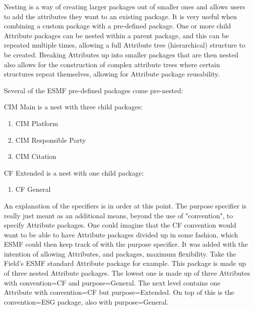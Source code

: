 %


\label{sec:AttPackNesting}


Nesting is a way of creating larger packages out of smaller ones and allows users to add the attributes they want to an existing package. It is very useful when combining a custom package with a pre-defined package. One or more child Attribute packages can be nested within a parent package, and this can be repeated multiple times, allowing a full Attribute tree (hierarchical) structure to be created.  Breaking Attributes up into smaller packages that are then nested also allows for the construction of complex attribute trees where certain structures repeat themselves, allowing for Attribute package reusability.


Several of the ESMF pre-defined packages come pre-nested:

CIM Main is a nest with three child packages:
\begin{enumerate}
   \item CIM Platform
   \item CIM Responsible Party
   \item CIM Citation
\end{enumerate}

CF Extended is a nest with one child package:

\begin{enumerate}
   \item CF General
\end{enumerate}

An explanation of the specifiers is in order at this point.  The purpose 
specifier is really just meant as an additional means, beyond the use of 
"convention", to specify Attribute packages.  One could imagine that the 
CF convention would want to be able to have Attribute packages divided 
up in some fashion, which ESMF could then keep track of with the purpose 
specifier.  It was added with the intention of allowing Attributes, and 
packages, maximum flexibility.  Take the Field's ESMF standard Attribute 
package for example.  This package is made up of three nested Attribute 
packages.  The lowest one is made up of three Attributes with convention=CF 
and purpose=General.  The next level contains one Attribute with convention=CF 
but purpose=Extended.  On top of this is the convention=ESG package, also 
with purpose=General.

